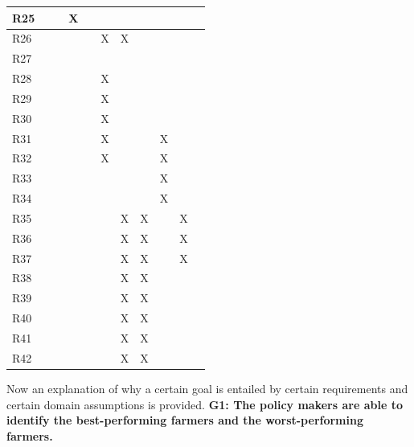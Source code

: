 \documentclass{article}
\begin{document}
\begin{longtable}[c]{|m{0.15cm}|m{0.15cm}|m{0.15cm}|m{0.15cm}|m{0.15cm}|m{0.15cm}|m{0.15cm}|m{0.15cm}|m{0.15cm}|m{0.15cm}|m{0.15cm}|}
 \hline
 R25 &   &   & X  &   &   &  &   &   &      \\
 \hline
 R26 &   &   &   &   & X  & X &   &   &      \\
 \hline
 R27 &   &   &   &   &   &  &   &   &      \\
 \hline
 R28 &   &   &   &   & X  &  &   &   &      \\
 \hline
 R29 &   &   &   &   & X  &  &   &   &      \\
 \hline
 R30 &   &   &   &   & X  &  &   &   &      \\
 \hline
 R31 &   &   &   &   & X  &   &   & X &      \\
 \hline
 R32 &   &   &   &   & X  &   &   & X &      \\
 \hline
 R33 &   &   &   &   &   &   &   & X &      \\
 \hline
 R34 &   &   &   &   &   &   &   & X &      \\
 \hline
 R35 &   &   &   &   &   & X  & X &   &    X \\
 \hline
 R36 &   &   &   &   &   & X  & X &   &    X \\
 \hline
 R37 &   &   &   &   &   & X  & X &   &    X \\
 \hline
 R38 &   &   &   &   &   & X  & X &   &      \\
 \hline
 R39 &   &   &   &   &   & X  & X &   &      \\
 \hline
 R40 &   &   &   &   &   & X  & X &   &      \\
 \hline
 R41 &   &   &   &   &   & X  & X &   &      \\
 \hline
 R42 &   &   &   &   &   &  X & X &   &      \\
 \hline
\end{longtable}
Now an explanation of why a certain goal is entailed by certain requirements and certain domain assumptions is provided.
\vspace{1cm}
\newline
\textbf{G1: The policy makers are able to identify the best-performing farmers and the worst-performing farmers.}
\end{document}
